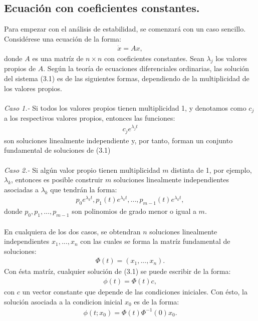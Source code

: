 \subsection{Ecuación con coeficientes constantes.}
Para empezar con el análisis de estabilidad, se comenzará con un caso sencillo. Considérese una ecuación de la forma:
\begin{eqnarray}
\dot{x}=Ax,
\end{eqnarray}
donde $A$ es una matríz de $n\times n$ con coeficientes constantes. Sean $\lambda_{j}$ los valores propios de $A$. Según la teoría de ecuaciones diferenciales ordinarias, las solución del sistema (3.1) es de las siguientes formas, dependiendo de la multiplicidad de los valores propios.
\\
\\
\textit{Caso 1.-} Si todos los valores propios tienen multiplicidad 1, y denotamos como $c_{j}$ a los respectivos valores propios, entonces las funciones:
\begin{eqnarray*}
c_{j}e^{\lambda_{j}t}
\end{eqnarray*}
son soluciones linealmente independiente y, por tanto, forman un conjunto fundamental de soluciones de (3.1)
\\
\\
\textit{Caso 2.-} Si algún valor propio tienen multiplicidad $m$ distinta de 1, por ejemplo, $\lambda_{k}$, entonces es posible construir $m$ soluciones linealmente independientes asociadas a $\lambda_{k}$ que tendrán la forma:
\begin{eqnarray*}
p_{0}e^{\lambda_{k}t}, p_{1}(t)e^{\lambda_{k}t}, ... , p_{m-1}(t)e^{\lambda_{k}t},
\end{eqnarray*}
donde $p_{0},p_{1},...,p_{m-1}$ son polinomios de grado menor o igual a $m$.
\\
\\
En cualquiera de los dos casos, se obtendran $n$ soluciones linealmente independientes $x_{1},...,x_{n}$ con las cuales se forma la matríz fundamental de soluciones:
\begin{eqnarray*}
\Phi(t)=(x_{1},...,x_{n}).
\end{eqnarray*}
Con ésta matríz, cualquier solución de (3.1) se puede escribir de la forma:
\begin{eqnarray*}
\phi(t)=\Phi(t)c,
\end{eqnarray*}
con $c$ un vector constante que depende de las condiciones iniciales. Con ésto, la solución asociada a la condicion inicial $x_{0}$ es de la forma:
\begin{eqnarray*}
\phi(t;x_{0})=\Phi(t)\Phi^{-1}(0)x_{0}.
\end{eqnarray*}
